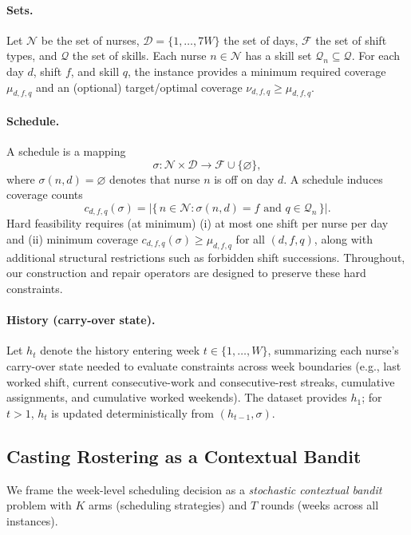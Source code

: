 \documentclass[11pt]{article}
\begin{document}
\paragraph{Sets.}
Let $\mathcal{N}$ be the set of nurses, $\mathcal{D}=\{1,\ldots,7W\}$ the
set of days, $\mathcal{F}$ the set of shift types, and $\mathcal{Q}$ the
set of skills. Each nurse $n\in\mathcal{N}$ has a skill set
$\mathcal{Q}_n \subseteq \mathcal{Q}$. For each day $d$, shift $f$, and
skill $q$, the instance provides a minimum required coverage
$\mu_{d,f,q}$ and an (optional) target/optimal coverage
$\nu_{d,f,q} \ge \mu_{d,f,q}$.

\paragraph{Schedule.}
A schedule is a mapping
\[
\sigma : \mathcal{N}\times\mathcal{D} \to \mathcal{F}\cup\{\varnothing\},
\]
where $\sigma(n,d)=\varnothing$ denotes that nurse $n$ is off on day $d$.
A schedule induces coverage counts
\[
c_{d,f,q}(\sigma)
= \bigl|\{\, n\in\mathcal{N} : \sigma(n,d)=f \text{ and } q\in\mathcal{Q}_n \,\}\bigr|.
\]
Hard feasibility requires (at minimum) (i) at most one shift per nurse
per day and (ii) minimum coverage $c_{d,f,q}(\sigma)\ge \mu_{d,f,q}$ for
all $(d,f,q)$, along with additional structural restrictions such as
forbidden shift successions. Throughout, our construction and repair
operators are designed to preserve these hard constraints.

\paragraph{History (carry-over state).}
Let $h_t$ denote the history entering week $t\in\{1,\ldots,W\}$,
summarizing each nurse's carry-over state needed to evaluate constraints
across week boundaries (e.g., last worked shift, current consecutive-work
and consecutive-rest streaks, cumulative assignments, and cumulative
worked weekends). The dataset provides $h_1$; for $t>1$, $h_t$ is updated
deterministically from $(h_{t-1},\sigma)$.
 
\subsection{Casting Rostering as a Contextual Bandit}

We frame the week-level scheduling decision as a \emph{stochastic
contextual bandit} problem with $K$ arms (scheduling strategies) and
$T$ rounds (weeks across all instances).
\end{document}
